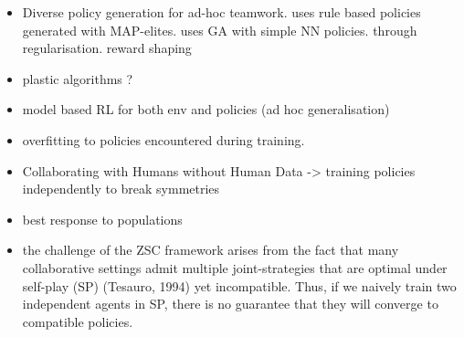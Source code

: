 \begin{itemize}
    \item Diverse policy generation for ad-hoc teamwork. \citep{canaan_generating_adapting_diverse_2023} uses rule based policies generated with MAP-elites. \citep{muglich_generalized_beliefs_cooperative_2022} uses GA with simple NN policies. \citep{lupu_trajectory_diversity_zero_2021} through regularisation. \citep{jaderberg_human_level_performance_2019} reward shaping
    \item plastic algorithms ? \citep{barrett_cooperating_unknown_teammates_2015, barrett_making_friends_fly_2017}
    \item model based RL for both env and policies (ad hoc generalisation) \citep{ribeiro_teamster_model_based_2023}
    \item overfitting to policies encountered during training. \citep{lanctot_unified_game_theoretic_2017}
    \item Collaborating with Humans without Human Data -> training policies independently to break symmetries
    \item best response to populations \citep{lupu_trajectory_diversity_zero_2021, strouse_collaboration_with_humans_2021}
    \item the challenge of the ZSC framework arises from the fact that
many collaborative settings admit multiple joint-strategies
that are optimal under self-play (SP) (Tesauro, 1994) yet
incompatible. Thus, if we naively train two independent
agents in SP, there is no guarantee that they will converge to
compatible policies.
\end{itemize}